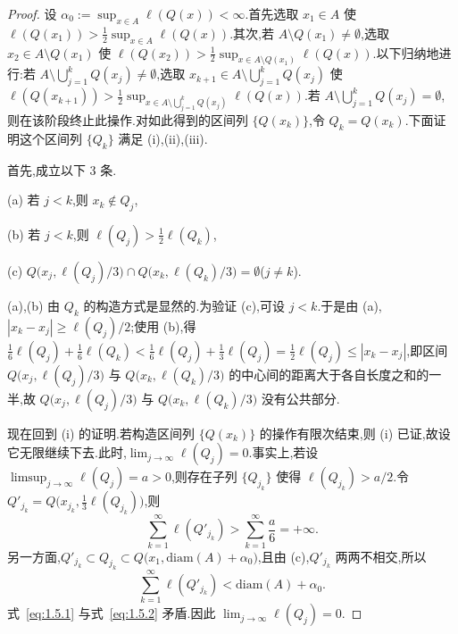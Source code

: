 \begin{proof}
设 $\alpha_{0} := \sup_{x \in A}\ell(Q(x)) < \infty$.首先选取 $x_{1} \in A$ 使 $\ell(Q(x_{1})) > \frac{1}{2}\sup_{x \in A}\ell(Q(x))$.其次,若 $A \setminus Q(x_{1}) \neq \emptyset$,选取 $x_{2} \in A \setminus Q(x_{1})$ 使 $\ell(Q(x_{2})) > \frac{1}{2}\sup_{x \in A \setminus Q(x_{1})}\ell(Q(x))$.以下归纳地进行:若 $A \setminus \bigcup_{j=1}^{k}Q(x_{j}) \neq \emptyset$,选取 $x_{k+1} \in A \setminus \bigcup_{j=1}^{k}Q(x_{j})$ 使 $\ell(Q(x_{k+1})) > \frac{1}{2}\sup_{x \in A \setminus \bigcup_{j=1}^{k}Q(x_{j})}\ell(Q(x))$.若 $A \setminus \bigcup_{j=1}^{k}Q(x_{j}) = \emptyset$,则在该阶段终止此操作.对如此得到的区间列 $\{Q(x_{k})\}$,令 $Q_{k} = Q(x_{k})$.下面证明这个区间列 $\{Q_{k}\}$ 满足 (i),(ii),(iii).

首先,成立以下 3 条.

(a) 若 $j < k$,则 $x_{k} \notin Q_{j}$,

(b) 若 $j < k$,则 $\ell(Q_{j}) > \frac{1}{2}\ell(Q_{k})$,

(c) $Q\bigl(x_{j}, \ell(Q_{j})/3\bigr) \cap Q\bigl(x_{k}, \ell(Q_{k})/3\bigr) = \emptyset$($j \neq k$).

(a),(b) 由 $Q_{k}$ 的构造方式是显然的.为验证 (c),可设 $j < k$.于是由 (a),$|x_{k} - x_{j}| \geq \ell(Q_{j})/2$;使用 (b),得 $\frac{1}{6}\ell(Q_{j}) + \frac{1}{6}\ell(Q_{k}) < \frac{1}{6}\ell(Q_{j}) + \frac{1}{3}\ell(Q_{j}) = \frac{1}{2}\ell(Q_{j}) \leq |x_{k} - x_{j}|$,即区间 $Q\bigl(x_{j}, \ell(Q_{j})/3\bigr)$ 与 $Q\bigl(x_{k}, \ell(Q_{k})/3\bigr)$ 的中心间的距离大于各自长度之和的一半,故 $Q\bigl(x_{j}, \ell(Q_{j})/3\bigr)$ 与 $Q\bigl(x_{k}, \ell(Q_{k})/3\bigr)$ 没有公共部分.

现在回到 (i) 的证明.若构造区间列 $\{Q(x_{k})\}$ 的操作有限次结束,则 (i) 已证,故设它无限继续下去.此时,$\lim_{j \to \infty}\ell(Q_{j}) = 0$.事实上,若设 $\limsup_{j \to \infty}\ell(Q_{j}) = a > 0$,则存在子列 $\{Q_{j_{k}}\}$ 使得 $\ell(Q_{j_{k}}) > a/2$.令 $Q'_{j_{k}} = Q\bigl(x_{j_{k}}, \frac{1}{3}\ell(Q_{j_{k}})\bigr)$,则
\begin{equation}\tag{1.5.1}
\sum_{k=1}^{\infty}\ell(Q'_{j_{k}}) > \sum_{k=1}^{\infty}\frac{a}{6} = +\infty.
\label{eq:1.5.1}\end{equation}
另一方面,$Q'_{j_{k}} \subset Q_{j_{k}} \subset Q\bigl(x_{1}, \mathrm{diam}(A) + \alpha_{0}\bigr)$,且由 (c),$Q'_{j_{k}}$ 两两不相交,所以
\begin{equation}\tag{1.5.2}
\sum_{k=1}^{\infty}\ell(Q'_{j_{k}}) < \mathrm{diam}(A) + \alpha_{0}.
\label{eq:1.5.2}\end{equation}
式~\eqref{eq:1.5.1} 与式~\eqref{eq:1.5.2} 矛盾.因此 $\lim_{j \to \infty}\ell(Q_{j}) = 0$.


\end{proof}
